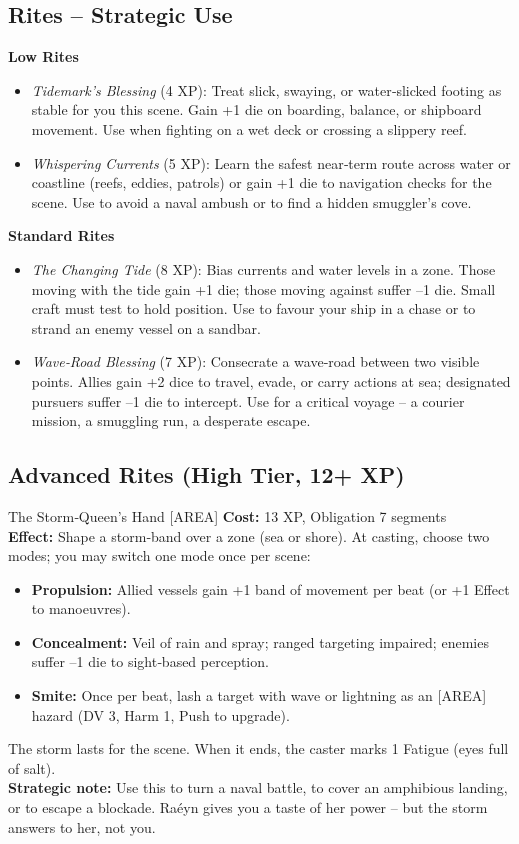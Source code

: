 \documentclass[10pt,a5paper]{book}
\begin{document}
\subsection*{Rites – Strategic Use}

\textbf{Low Rites}
\begin{itemize}
    \item \textit{Tidemark’s Blessing} (4 XP): Treat slick, swaying, or water‑slicked footing as stable for you this scene. Gain +1 die on boarding, balance, or shipboard movement. Use when fighting on a wet deck or crossing a slippery reef.
    \item \textit{Whispering Currents} (5 XP): Learn the safest near‑term route across water or coastline (reefs, eddies, patrols) or gain +1 die to navigation checks for the scene. Use to avoid a naval ambush or to find a hidden smuggler’s cove.
\end{itemize}

\textbf{Standard Rites}
\begin{itemize}
    \item \textit{The Changing Tide} (8 XP): Bias currents and water levels in a zone. Those moving with the tide gain +1 die; those moving against suffer –1 die. Small craft must test to hold position. Use to favour your ship in a chase or to strand an enemy vessel on a sandbar.
    \item \textit{Wave‑Road Blessing} (7 XP): Consecrate a wave‑road between two visible points. Allies gain +2 dice to travel, evade, or carry actions at sea; designated pursuers suffer –1 die to intercept. Use for a critical voyage – a courier mission, a smuggling run, a desperate escape.
\end{itemize}

\subsection*{Advanced Rites (High Tier, 12+ XP)}

\begin{patronbox}{The Storm‑Queen’s Hand [AREA]}
\textbf{Cost:} 13 XP, Obligation 7 segments \\
\textbf{Effect:} Shape a storm‑band over a zone (sea or shore). At casting, choose two modes; you may switch one mode once per scene:
\begin{itemize}
    \item \textbf{Propulsion:} Allied vessels gain +1 band of movement per beat (or +1 Effect to manoeuvres).
    \item \textbf{Concealment:} Veil of rain and spray; ranged targeting impaired; enemies suffer –1 die to sight‑based perception.
    \item \textbf{Smite:} Once per beat, lash a target with wave or lightning as an [AREA] hazard (DV 3, Harm 1, Push to upgrade).
\end{itemize}
The storm lasts for the scene. When it ends, the caster marks 1 Fatigue (eyes full of salt). \\
\textbf{Strategic note:} Use this to turn a naval battle, to cover an amphibious landing, or to escape a blockade. Raéyn gives you a taste of her power – but the storm answers to her, not you.
\end{patronbox}
\end{document}
